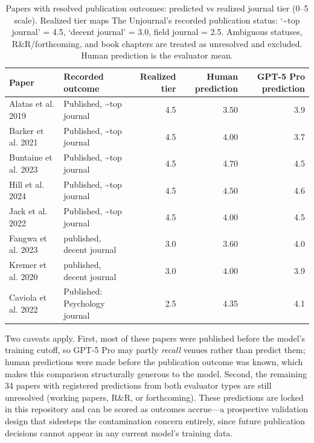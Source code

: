 \documentclass[
  11pt,
  letterpaper,
]{article}
\begin{document}
\begin{table}

\caption{\label{tbl-tier-outcomes}Papers with resolved publication
outcomes: predicted vs realized journal tier (0--5 scale). Realized tier
maps The Unjournal's recorded publication status: `\textasciitilde top
journal' = 4.5, `decent journal' = 3.0, field journal = 2.5. Ambiguous
statuses, R\&R/forthcoming, and book chapters are treated as unresolved
and excluded. Human prediction is the evaluator mean.}

\begin{tabular}{l|l|r|r|r}
\hline
Paper & Recorded outcome & Realized tier & Human prediction & GPT-5 Pro prediction\\
\hline
Alatas et al. 2019 & Published, \textasciitilde{}top journal & 4.5 & 3.50 & 3.9\\
\hline
Barker et al. 2021 & Published, \textasciitilde{}top journal & 4.5 & 4.00 & 3.7\\
\hline
Buntaine et al. 2023 & Published, \textasciitilde{}top journal & 4.5 & 4.70 & 4.5\\
\hline
Hill et al. 2024 & Published, \textasciitilde{}top journal & 4.5 & 4.50 & 4.6\\
\hline
Jack et al. 2022 & Published, \textasciitilde{}top journal & 4.5 & 4.00 & 4.5\\
\hline
Fangwa et al. 2023 & published, decent journal & 3.0 & 3.60 & 4.0\\
\hline
Kremer et al. 2020 & published, decent journal & 3.0 & 4.00 & 3.9\\
\hline
Caviola et al. 2022 & Published: Psychology journal & 2.5 & 4.35 & 4.1\\
\hline
\end{tabular}

\end{table}%

Two caveats apply. First, most of these papers were published before the
model's training cutoff, so GPT-5 Pro may partly \emph{recall} venues
rather than predict them; human predictions were made before the
publication outcome was known, which makes this comparison structurally
generous to the model. Second, the remaining 34 papers with registered
predictions from both evaluator types are still unresolved (working
papers, R\&R, or forthcoming). These predictions are locked in this
repository and can be scored as outcomes accrue---a prospective
validation design that sidesteps the contamination concern entirely,
since future publication decisions cannot appear in any current model's
training data.
\end{document}
